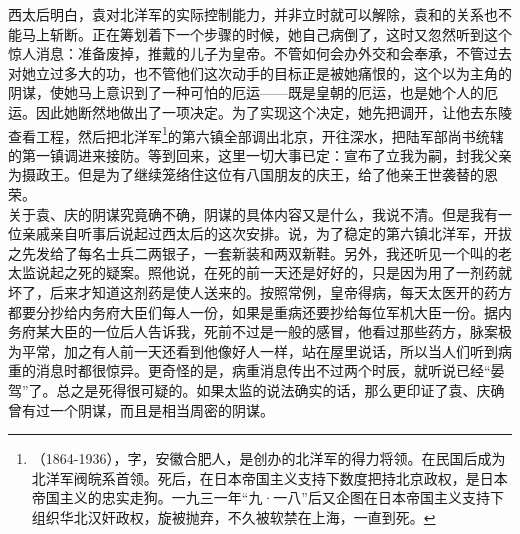 西太后明白，袁对北洋军的实际控制能力，并非立时就可以解除，袁和的关系也不能马上斩断。正在筹划着下一个步骤的时候，她自己病倒了，这时又忽然听到这个惊人消息：准备废掉，推戴的儿子为皇帝。不管如何会办外交和会奉承，不管过去对她立过多大的功，也不管他们这次动手的目标正是被她痛恨的，这个以为主角的阴谋，使她马上意识到了一种可怕的厄运——既是皇朝的厄运，也是她个人的厄运。因此她断然地做出了一项决定。为了实现这个决定，她先把调开，让他去东陵查看工程，然后把北洋军\footnote{（1864-1936），字，安徽合肥人，是创办的北洋军的得力将领。在民国后成为北洋军阀皖系首领。死后，在日本帝国主义支持下数度把持北京政权，是日本帝国主义的忠实走狗。一九三一年“九·一八”后又企图在日本帝国主义支持下组织华北汉奸政权，旋被抛弃，不久被软禁在上海，一直到死。}的第六镇全部调出北京，开往深水，把陆军部尚书统辖的第一镇调进来接防。等到回来，这里一切大事已定：宣布了立我为嗣，封我父亲为摄政王。但是为了继续笼络住这位有八国朋友的庆王，给了他亲王世袭替的恩荣。\\

关于袁、庆的阴谋究竟确不确，阴谋的具体内容又是什么，我说不清。但是我有一位亲戚亲自听事后说起过西太后的这次安排。说，为了稳定的第六镇北洋军，开拔之先发给了每名士兵二两银子，一套新装和两双新鞋。另外，我还听见一个叫的老太监说起之死的疑案。照他说，在死的前一天还是好好的，只是因为用了一剂药就坏了，后来才知道这剂药是使人送来的。按照常例，皇帝得病，每天太医开的药方都要分抄给内务府大臣们每人一份，如果是重病还要抄给每位军机大臣一份。据内务府某大臣的一位后人告诉我，死前不过是一般的感冒，他看过那些药方，脉案极为平常，加之有人前一天还看到他像好人一样，站在屋里说话，所以当人们听到病重的消息时都很惊异。更奇怪的是，病重消息传出不过两个时辰，就听说已经“晏驾”了。总之是死得很可疑的。如果太监的说法确实的话，那么更印证了袁、庆确曾有过一个阴谋，而且是相当周密的阴谋。\\

